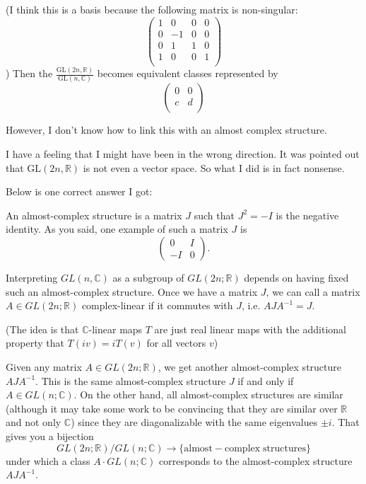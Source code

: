 \documentclass{article}
\numberwithin{equation}{subsection} %
\theoremstyle{definition}
\begin{document}
        (I think this is a basis because the following matrix is 
        non-singular:
        $$
        \left(
        \begin{array}{cccc}
         1 & 0 & 0 & 0 \\
         0 & -1 & 0 & 0 \\
         0 & 1 & 1 & 0 \\
         1 & 0 & 0 & 1 \\
        \end{array}
        \right)
        $$)
        Then the $\frac{\mathrm{GL}(2n,\mathbb{R})}{\mathrm{GL}
        (n,\mathbb{C})}$ becomes equivalent classes represented by 
        $$
        \left(
        \begin{array}{cc}
         0 & 0 \\
         c & d \\
        \end{array}
        \right)
        $$

        However, I don't know how to link this with an almost complex 
        structure.  

        I have a feeling that I might have been in the wrong direction. 
        It was pointed out that $\mathrm{GL}(2n,\mathbb{R})$ is not
        even a vector space. So what I did is in fact nonsense.
        
        Below is one correct answer I got:

        An almost-complex structure is a matrix $J$ such that $J^2 = -I$
        is the negative identity. As you said, one example of such a 
        matrix $J$ is $$\begin{pmatrix} 0 & I \\ -I & 0 \end{pmatrix}.$$

        Interpreting $GL(n,\mathbb{C})$ as a subgroup of 
        $GL(2n;\mathbb{R})$ depends on having fixed such an 
        almost-complex structure. Once we have a matrix $J$, we can call 
        a matrix $A \in GL(2n;\mathbb{R})$ complex-linear if it commutes 
        with $J$, i.e. $AJA^{-1} = J.$

        (The idea is that $\mathbb{C}$-linear maps $T$ are just real 
        linear maps with the additional property that $T(iv) = i T(v)$
        for all vectors $v$)

        Given any matrix $A \in GL(2n;\mathbb{R})$, we get another 
        almost-complex structure $AJA^{-1}$. This is the same 
        almost-complex structure $J$ if and only if 
        $A \in GL(n;\mathbb{C}).$ On the other hand, all almost-complex 
        structures are similar (although it may take some work to be 
        convincing that they are similar over $\mathbb{R}$ and not 
        only $\mathbb{C}$) since they are diagonalizable with the same 
        eigenvalues $\pm i$. That gives you a bijection 
        $$
            GL(2n;\mathbb{R}) / GL(n;\mathbb{C}) \longrightarrow 
            \{\mathrm{almost}-\mathrm{complex}\; 
            \mathrm{structures}\}
        $$ 
        under which a class $A \cdot GL(n;\mathbb{C})$ corresponds 
        to the almost-complex structure $AJA^{-1}.$
\end{document}
